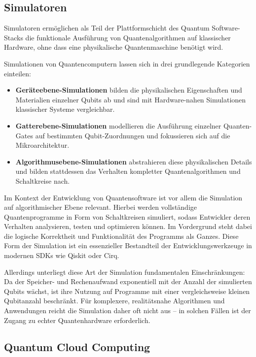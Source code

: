 \subsection{Simulatoren}
\label{sec:simulators}

Simulatoren ermöglichen als Teil der Plattformschicht des Quantum Software-Stacks die funktionale Ausführung von Quantenalgorithmen auf klassischer Hardware, ohne dass eine physikalische Quantenmaschine benötigt wird.

Simulationen von Quantencomputern lassen sich in drei grundlegende Kategorien einteilen:
\begin{itemize}
\item \textbf{Geräteebene-Simulationen} bilden die physikalischen Eigenschaften und Materialien einzelner Qubits ab und sind mit Hardware-nahen Simulationen klassischer Systeme vergleichbar.
\item \textbf{Gatterebene-Simulationen} modellieren die Ausführung einzelner Quanten-Gates auf bestimmten Qubit-Zuordnungen und fokussieren sich auf die Mikroarchitektur.
\item \textbf{Algorithmusebene-Simulationen} abstrahieren diese physikalischen Details und bilden stattdessen das Verhalten kompletter Quantenalgorithmen und Schaltkreise nach.
\end{itemize}

Im Kontext der Entwicklung von Quantensoftware ist vor allem die Simulation auf algorithmischer Ebene relevant. Hierbei werden vollständige Quantenprogramme in Form von Schaltkreisen simuliert, sodass Entwickler deren Verhalten analysieren, testen und optimieren können. Im Vordergrund steht dabei die logische Korrektheit und Funktionalität des Programms als Ganzes. Diese Form der Simulation ist ein essenzieller Bestandteil der Entwicklungswerkzeuge in modernen SDKs wie Qiskit oder Cirq.

Allerdings unterliegt diese Art der Simulation fundamentalen Einschränkungen: Da der Speicher- und Rechenaufwand exponentiell mit der Anzahl der simulierten Qubits wächst, ist ihre Nutzung auf Programme mit einer vergleichsweise kleinen Qubitanzahl beschränkt. Für komplexere, realitätsnahe Algorithmen und Anwendungen reicht die Simulation daher oft nicht aus -- in solchen Fällen ist der Zugang zu echter Quantenhardware erforderlich. \autocite{cicero_simulation_2025}

\subsection{Quantum Cloud Computing}
\label{sec:quantum-cloud-computing}


